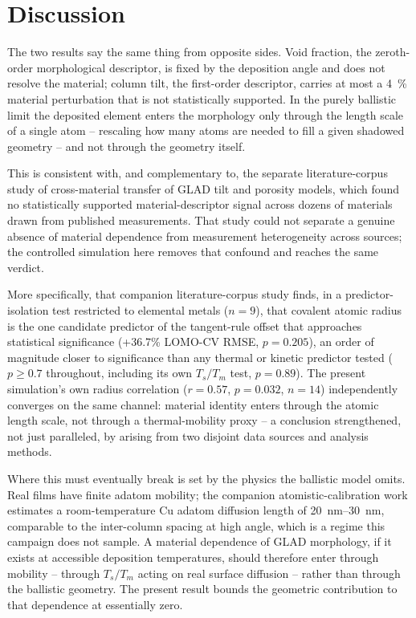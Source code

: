 \documentclass[aip,jcp,amsmath,amssymb,reprint]{revtex4-1}
\begin{document}
\section{Discussion}
\label{sec:discussion}

The two results say the same thing from opposite sides. Void fraction, the
zeroth-order morphological descriptor, is fixed by the deposition angle and does
not resolve the material; column tilt, the first-order descriptor, carries at
most a \SI{4}{\percent} material perturbation that is not statistically
supported. In the purely ballistic limit the deposited element enters the
morphology only through the length scale of a single atom -- rescaling how many
atoms are needed to fill a given shadowed geometry -- and not through the
geometry itself.

This is consistent with, and complementary to, the separate literature-corpus
study of cross-material transfer of GLAD tilt and porosity models, which found
no statistically supported material-descriptor signal across dozens of materials
drawn from published measurements. That study could not separate a genuine
absence of material dependence from measurement heterogeneity across sources;
the controlled simulation here removes that confound and reaches the same
verdict.

More specifically, that companion literature-corpus study finds, in a
predictor-isolation test restricted to elemental metals ($n=9$), that
covalent atomic radius is the one candidate predictor of the tangent-rule
offset that approaches statistical significance (+36.7\% LOMO-CV RMSE,
$p=0.205$), an order of magnitude closer to significance than any thermal
or kinetic predictor tested ($p\geq0.7$ throughout, including its own
$T_s/T_m$ test, $p=0.89$). The present simulation's own radius correlation
($r=0.57$, $p=0.032$, $n=14$) independently converges on the same channel:
material identity enters through the atomic length scale, not through a
thermal-mobility proxy -- a conclusion strengthened, not just paralleled, by
arising from two disjoint data sources and analysis methods.

Where this must eventually break is set by the physics the ballistic model omits.
Real films have finite adatom mobility; the companion atomistic-calibration work
estimates a room-temperature Cu adatom diffusion length of
\SIrange{20}{30}{nm}, comparable to the inter-column spacing at high angle, which
is a regime this campaign does not sample. A material dependence of GLAD
morphology, if it exists at accessible deposition temperatures, should therefore
enter through mobility -- through $T_s/T_m$ acting on real surface diffusion --
rather than through the ballistic geometry. The present result bounds the
geometric contribution to that dependence at essentially zero.
\end{document}
